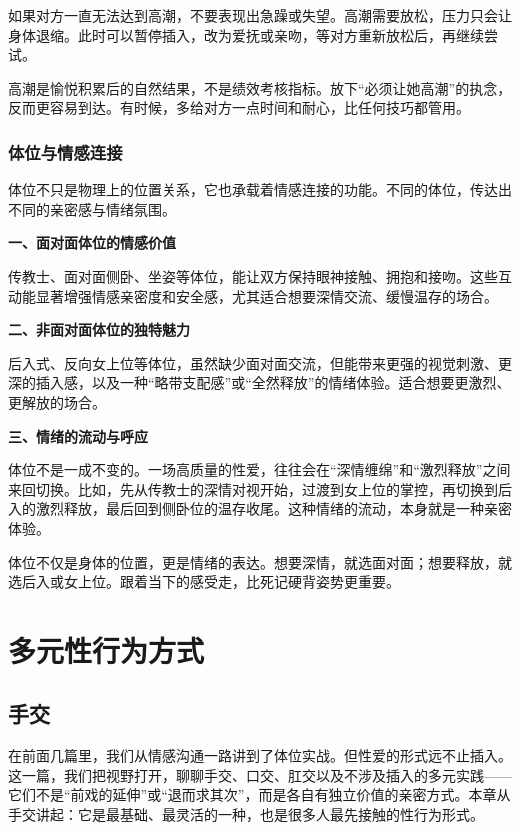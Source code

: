 \documentclass[12pt,UTF8]{ctexbook}
\begin{document}
如果对方一直无法达到高潮，不要表现出急躁或失望。高潮需要放松，压力只会让身体退缩。此时可以暂停插入，改为爱抚或亲吻，等对方重新放松后，再继续尝试。

\begin{tcolorbox}[colback=pink!5!white,colframe=red!50!black,title=贴心小叮咛]
高潮是愉悦积累后的自然结果，不是绩效考核指标。放下“必须让她高潮”的执念，反而更容易到达。有时候，多给对方一点时间和耐心，比任何技巧都管用。
\end{tcolorbox}

\section{体位与情感连接}

体位不只是物理上的位置关系，它也承载着情感连接的功能。不同的体位，传达出不同的亲密感与情绪氛围。

\textbf{一、面对面体位的情感价值}

传教士、面对面侧卧、坐姿等体位，能让双方保持眼神接触、拥抱和接吻。这些互动能显著增强情感亲密度和安全感，尤其适合想要深情交流、缓慢温存的场合。

\textbf{二、非面对面体位的独特魅力}

后入式、反向女上位等体位，虽然缺少面对面交流，但能带来更强的视觉刺激、更深的插入感，以及一种“略带支配感”或“全然释放”的情绪体验。适合想要更激烈、更解放的场合。

\textbf{三、情绪的流动与呼应}

体位不是一成不变的。一场高质量的性爱，往往会在“深情缠绵”和“激烈释放”之间来回切换。比如，先从传教士的深情对视开始，过渡到女上位的掌控，再切换到后入的激烈释放，最后回到侧卧位的温存收尾。这种情绪的流动，本身就是一种亲密体验。

\begin{tcolorbox}[colback=pink!5!white,colframe=red!50!black,title=贴心小叮咛]
体位不仅是身体的位置，更是情绪的表达。想要深情，就选面对面；想要释放，就选后入或女上位。跟着当下的感受走，比死记硬背姿势更重要。
\end{tcolorbox}

\part{多元性行为方式}

\chapter{手交}

在前面几篇里，我们从情感沟通一路讲到了体位实战。但性爱的形式远不止插入。这一篇，我们把视野打开，聊聊手交、口交、肛交以及不涉及插入的多元实践——它们不是“前戏的延伸”或“退而求其次”，而是各自有独立价值的亲密方式。本章从手交讲起：它是最基础、最灵活的一种，也是很多人最先接触的性行为形式。
\end{document}
